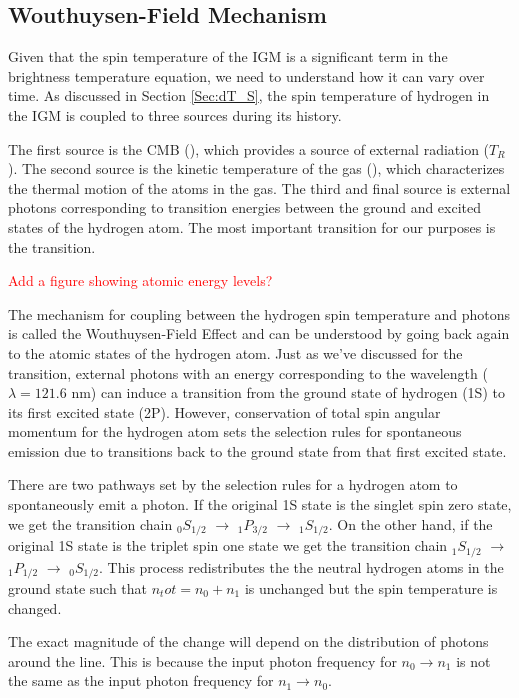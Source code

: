 \subsection{Wouthuysen-Field Mechanism}\label{Sec:WFM}
Given that the spin temperature of the IGM is a significant term in the brightness temperature equation, we need to understand how it can vary over time. As discussed in Section \ref{Sec:dT_S}, the spin temperature of hydrogen in the IGM is coupled to three sources during its history. 

The first source is the CMB (\tg), which provides a source of external radiation ($T_R$). The second source is the kinetic temperature of the gas (\tk), which characterizes the thermal motion of the atoms in the gas. The third and final source is external photons corresponding to transition energies between the ground and excited states of the hydrogen atom. The most important transition for our purposes is the \lya  transition. 

\textcolor{red}{Add a figure showing atomic energy levels?}

The mechanism for coupling between the hydrogen spin temperature and \lya  photons is called the Wouthuysen-Field Effect \cite{wouthuysen_1952}\cite{field_1958} and can be understood by going back again to the atomic states of the hydrogen atom. Just as we've discussed for the \cm transition, external photons with an energy corresponding to the \lya  wavelength ($\lambda = 121.6$ nm) can induce a transition from the ground state of hydrogen (1S) to its first excited state (2P). However, conservation of total spin angular momentum for the hydrogen atom sets the selection rules for spontaneous emission due to transitions back to the ground state from that first excited state. 

There are two pathways set by the selection rules for a hydrogen atom to spontaneously emit a \lya  photon. If the original 1S state is the singlet spin zero state, we get the transition chain $_0S_{1/2}$ $\rightarrow$ $_1P_{3/2}$ $\rightarrow$ $_1S_{1/2}$. On the other hand, if the original 1S state is the triplet spin one state we get the transition chain $_1S_{1/2}$ $\rightarrow$ $_1P_{1/2}$ $\rightarrow$ $_0S_{1/2}$. This process redistributes the the neutral hydrogen atoms in the ground state such that $n_tot = n_0 + n_1$ is unchanged but the spin temperature is changed. 

The exact magnitude of the change will depend on the distribution of photons around the \lya  line. This is because the input photon frequency for $n_0 \rightarrow n_1$ is not the same as the input photon frequency for $n_1 \rightarrow n_0$.

